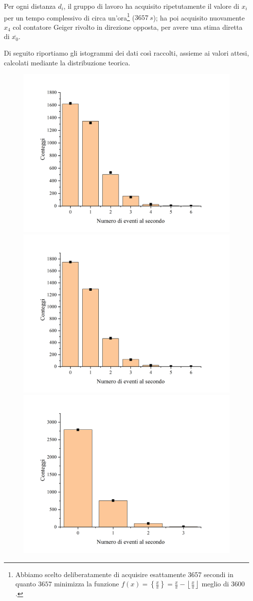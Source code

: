 \documentclass{article}
\begin{document}
Per ogni distanza $d_i$, il gruppo di lavoro ha acquisito ripetutamente il valore di
$x_i$ per un tempo complessivo di circa un'ora\footnote{
    Abbiamo scelto deliberatamente di acquisire esattamente 3657 secondi in quanto
    $3657$ minimizza la funzione
    $f(x)=\left\{\frac{x}{\pi}\right\}=\frac{x}{\pi} - \left\lfloor\frac{x}{\pi}\right\rfloor$
    meglio di $3600$.
} ($\qty{3657}{s}$); ha poi acquisito nuovamente $x_4$ col contatore Geiger rivolto in
direzione opposta, per avere una stima diretta di $\overline{x_0}$.

Di seguito riportiamo gli istogrammi dei dati così raccolti,
assieme ai valori attesi, calcolati mediante la distribuzione teorica.

\begin{center}
    \begin{figure}[H]
        \includegraphics[trim={2cm .5cm 2.4cm 2.1cm},clip,width=.5\textwidth]{img/Geiger2.jpg}
        \includegraphics[trim={2cm .5cm 2.4cm 2.1cm},clip,width=.5\textwidth]{img/Geiger1.jpg}
        \includegraphics[trim={2cm .5cm 2.4cm 2.1cm},clip,width=.5\textwidth]{img/Geiger4.jpg}

\end{figure}
\end{center}
\end{document}
